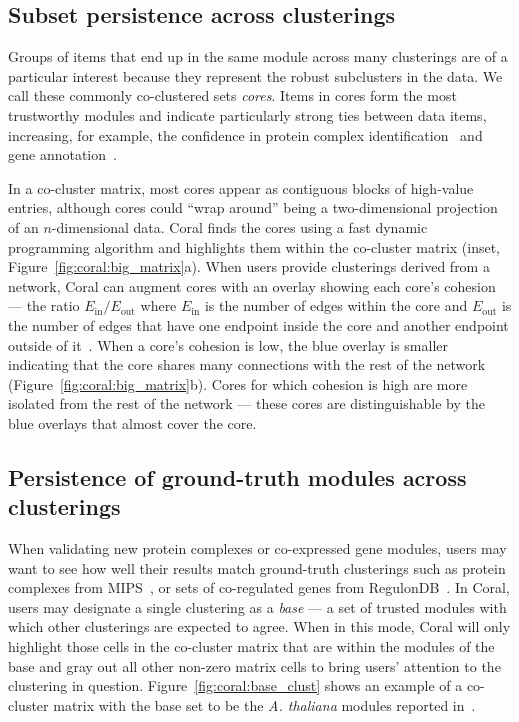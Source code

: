 \documentclass[12pt]{cmuthesis}
\newcommand\Coral{Coral\xspace}
\newcommand{\Athal}{\textit{A. thaliana}\xspace}
\begin{document}
  \subsection{Subset persistence across clusterings}
  \label{sec:cores}

  Groups of items that end up in the same module across many clusterings are of a particular interest because they represent the robust subclusters in the data. We call these commonly co-clustered sets \textit{cores}. Items in cores form the most trustworthy modules and indicate particularly strong ties between data items, increasing, for example, the confidence in protein complex identification~\cite{Luo2009} and gene annotation~\cite{Saha}.

  In a co-cluster matrix, most cores appear as contiguous blocks of high-value entries, although cores could ``wrap around'' being a two-dimensional projection of an $n$-dimensional data. \Coral finds the cores using a fast dynamic programming algorithm and highlights them within the co-cluster matrix (inset, Figure~\ref{fig:coral:big_matrix}a). When users provide clusterings derived from a network, \Coral can augment cores with an overlay showing each core's cohesion --- the ratio $E_\textrm{in} / E_\textrm{out}$ where $E_\textrm{in}$ is the number of edges within the core and $E_\textrm{out}$ is the number of edges that have one endpoint inside the core and another endpoint outside of it~\cite{Bailey1982}. When a core's cohesion is low, the blue overlay is smaller indicating that the core shares many connections with the rest of the network (Figure~\ref{fig:coral:big_matrix}b). Cores for which cohesion is high are more isolated from the rest of the network --- these cores are distinguishable by the blue overlays that almost cover the core.


  \subsection{Persistence of ground-truth modules across clusterings}

  When validating new protein complexes or co-expressed gene modules, users may want to see how well their results match ground-truth clusterings such as protein complexes from MIPS~\cite{Mewes2011}, or sets of co-regulated genes from RegulonDB~\cite{Gama-Castro2011}. In \Coral, users may designate a single clustering as a \textit{base} --- a set of trusted modules with which other clusterings are expected to agree. When in this mode, \Coral will only highlight those cells in the co-cluster matrix that are within the modules of the base and gray out all other non-zero matrix cells to bring users' attention to the clustering in question. Figure~\ref{fig:coral:base_clust} shows an example of a co-cluster matrix with the base set to be the \Athal modules reported in~\cite{Vidal2011}.
\end{document}
